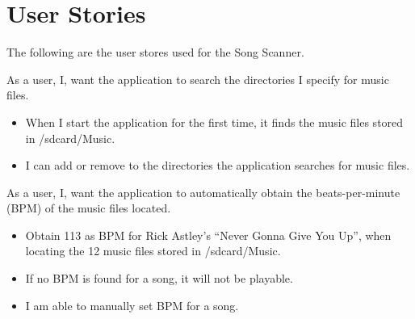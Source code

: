 \section{User Stories}
The following are the user stores used for the Song Scanner.

{As a user, I, want the application to search the directories I specify for music files.}
{\begin{itemize}
\item When I start the application for the first time, it finds the music files stored in /sdcard/Music.
\item I can add or remove to the directories the application searches for music files.
\end{itemize}}

{As a user, I, want the application to automatically obtain the beats-per-minute (BPM) of the music files located.}
{\begin{itemize}
\item Obtain 113 as BPM for Rick Astley's ``Never Gonna Give You Up'', when locating the 12 music files stored in /sdcard/Music.
\item If no BPM is found for a song, it will not be playable.
\item I am able to manually set BPM for a song.
\end{itemize}}